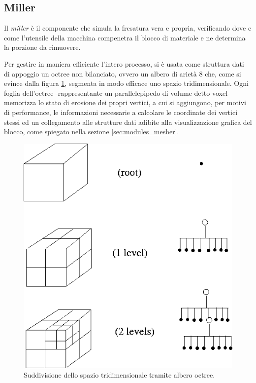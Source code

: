 \subsection{Miller}
Il \emph{miller} è il componente che simula la fresatura vera e propria, verificando dove e come l'utensile della macchina compenetra il blocco di materiale e ne determina la porzione da rimuovere.

Per gestire in maniera efficiente l'intero processo, si è usata come struttura dati di appoggio un octree non bilanciato, ovvero un albero di arietà 8 che, come si evince dalla figura \ref{fig:octree_explanation}, segmenta in modo efficace uno spazio tridimensionale. Ogni foglia dell'octree -rappresentante un parallelepipedo di volume detto voxel- memorizza lo stato di erosione dei propri vertici, a cui si aggiungono, per motivi di performance, le informazioni necessarie a calcolare le coordinate dei vertici stessi ed un collegamento alle strutture dati adibite alla visualizzazione grafica del blocco, come spiegato nella sezione \ref{sec:modules_mesher}.
\begin{figure}[htp]
	\centering
	\includegraphics[width=.75\textwidth]{img/octree_explanation}
	\caption{Suddivisione dello spazio tridimensionale tramite albero octree.}
	\label{fig:octree_explanation}
\end{figure}

